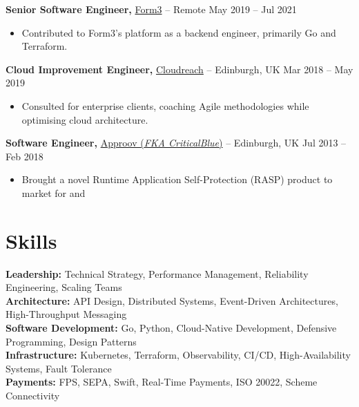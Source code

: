 \documentclass[11pt]{article}       %
\begin{document}
\textbf{Senior Software Engineer,} \href{https://form3.tech/}{Form3} -- Remote \hfill May 2019 -- Jul 2021 \\
\vspace{-9pt}
\begin{itemize}
  \item Contributed to Form3's platform as a backend engineer, primarily Go and Terraform. \\
\end{itemize}

\textbf{Cloud Improvement Engineer,} \href{https://eviden.com/about-us/legacy-brands/cloudreach/}{Cloudreach} -- Edinburgh, UK \hfill Mar 2018 -- May 2019 \\
\vspace{-9pt}
\begin{itemize}
  \item Consulted for enterprise clients, coaching Agile methodologies while optimising cloud architecture. \\
\end{itemize}

\textbf{Software Engineer,} \href{https://approov.io/}{Approov (\textit{FKA CriticalBlue})} -- Edinburgh, UK \hfill Jul 2013 -- Feb 2018 \\ 
\vspace{-9pt}
\begin{itemize}
  \item Brought a novel Runtime Application Self-Protection (RASP) product to market for  and  \\
\end{itemize}

\section*{Skills}
\textbf{Leadership:} Technical Strategy, Performance Management, Reliability Engineering, Scaling Teams \\
\textbf{Architecture:} API Design, Distributed Systems, Event-Driven Architectures, High-Throughput Messaging \\  
\textbf{Software Development:} Go, Python, Cloud-Native Development, Defensive Programming, Design Patterns \\
\textbf{Infrastructure:} Kubernetes, Terraform, Observability, CI/CD, High-Availability Systems, Fault Tolerance \\
\textbf{Payments:} FPS, SEPA, Swift, Real-Time Payments, ISO 20022, Scheme Connectivity \\
\end{document}
